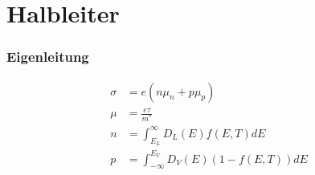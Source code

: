 \section{Halbleiter}

\subsubsection*{Eigenleitung}
\begin{equation*}
    \begin{aligned}
        \sigma &= e (n \mu_n + p \mu_p) \\
        \mu &= \frac{e \tau}{m^*} \\
        n &= \int_{E_L}^\infty D_L(E) f(E,T) dE \\
        p &= \int_{-\infty}^{E_V} D_V(E) (1-f(E,T)) dE
    \end{aligned}
\end{equation*}